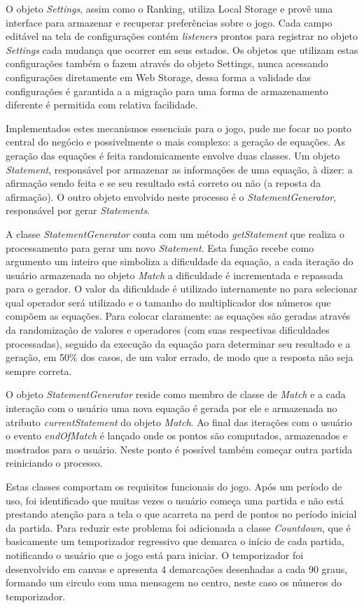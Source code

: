 O objeto \textit{Settings}, assim como o Ranking, utiliza Local Storage
e provê uma interface para armazenar e recuperar preferências sobre
o jogo. Cada campo editável na tela de configurações contém
\textit{listeners} prontos para registrar no objeto \textit{Settings}
cada mudança que ocorrer em seus estados. Os objetos que utilizam estas
configurações também o fazem através do objeto Settings, nunca
acessando configurações diretamente em Web Storage, dessa forma a
validade das configurações é garantida a a migração para uma forma
de armazenamento diferente é permitida com relativa facilidade.

Implementados estes mecanismos essenciais para o jogo, pude me
focar no ponto central do negócio e possivelmente o mais complexo:
a geração de equações. As geração das equações é feita
randomicamente envolve duas classes. Um objeto \textit{Statement},
responsável por armazenar as informações de uma equação, à dizer:
a afirmação sendo feita e se seu resultado está correto ou não (a
reposta da afirmação). O outro objeto envolvido neste processo é o
\textit{StatementGenerator}, responsável por gerar \textit{Statements}.

A classe \textit{StatementGenerator} conta com um método
\textit{getStatement} que realiza o processamento para gerar um
novo \textit{Statement}. Esta função recebe como argumento um
inteiro que simboliza a dificuldade da equação, a cada iteração
do usuário armazenada no objeto \textit{Match} a dificuldade é
incrementada e repassada para o gerador. O valor da dificuldade
é utilizado internamente no para selecionar qual operador será
utilizado e o tamanho do multiplicador dos números que compõem
as equações. Para colocar claramente: as equações são geradas
através da randomização de valores e operadores (com suas respectivas
dificuldades processadas), seguido da execução da equação para
determinar seu resultado e a geração, em 50\% dos casos, de um valor
errado, de modo que a resposta não seja sempre correta.

O objeto \textit{StatementGenerator} reside como membro de classe de
\textit{Match} e a cada interação com o usuário uma nova equação
é gerada por ele e armazenada no atributo \textit{currentStatement}
do objeto \textit{Match}. Ao final das iterações com o usuário o
evento \textit{endOfMatch} é lançado onde os pontos são computados,
armazenados e mostrados para o usuário. Neste ponto é possível
também começar outra partida reiniciando o processo.

Estas classes comportam os requisitos funcionais do jogo. Após um
período de uso, foi identificado que muitas vezes o usuário começa
uma partida e não está prestando atenção para a tela o que acarreta
na perd de pontos no período inicial da partida. Para reduzir este
problema foi adicionada a classe \textit{Countdown}, que é basicamente
um temporizador regressivo que demarca o início de cada partida,
notificando o usuário que o jogo está para iniciar. O temporizador foi
desenvolvido em canvas e apresenta 4 demarcações desenhadas a cada 90
graus, formando um circulo com uma mensagem no centro, neste caso os
números do temporizador.


